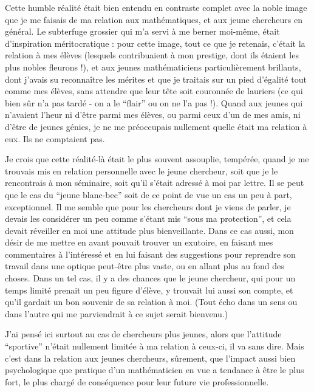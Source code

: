 Cette humble réalité était bien entendu en contraste complet avec la noble image que je me faisais de ma relation aux mathématiques, et aux jeune chercheurs en général. Le subterfuge grossier qui m'a servi à me berner moi-même, était d'inspiration méritocratique : pour cette image, tout ce que je retenais, c'était la relation à mes élèves (lesquels contribuaient à mon prestige, dont ils étaient les plus nobles fleurons !), et aux jeunes mathématiciens particulièrement brillants, dont j'avais su reconnaître les mérites et que je traitais sur un pied d'égalité tout comme mes élèves, sans attendre que leur tête soit couronnée de lauriers (ce qui bien sûr n'a pas tardé - on a le ``flair'' ou on ne l'a pas !). Quand aux jeunes qui n'avaient l'heur ni d'être parmi mes élèves, ou parmi ceux d'un de mes amis, ni d'être de jeunes génies, je ne me préoccupais nullement quelle était ma relation à eux. Ils ne comptaient pas.

Je crois que cette réalité-là était le plus souvent assouplie, tempérée, quand je me trouvais mis en relation personnelle avec le jeune chercheur, soit que je le rencontrais à mon séminaire, soit qu'il s'était adressé à moi par lettre. Il se peut que le cas du ``jeune blanc-bec'' soit de ce point de vue un cas un peu à part, exceptionnel. Il me semble que pour les chercheurs dont je viens de parler, je devais les considérer un peu comme s'étant mis ``sous ma protection'', et cela devait réveiller en moi une attitude plus bienveillante. Dans ce cas aussi, mon désir de me mettre en avant pouvait trouver un exutoire, en faisant mes commentaires à l'intéressé et en lui faisant des suggestions pour reprendre son travail dans une optique peut-être plus vaste, ou en allant plus au fond des choses. Dans un tel cas, il y a des chances que le jeune chercheur, qui pour un temps limité prenait un peu figure d'élève, y trouvait lui aussi son compte, et qu'il gardait un bon souvenir de sa relation à moi. (Tout écho dans un sens ou dans l'autre qui me parviendrait à ce sujet serait bienvenu.)

J'ai pensé ici surtout au cas de chercheurs plus jeunes, alors que l'attitude ``sportive'' n'était nullement limitée à ma relation à ceux-ci, il va sans dire. Mais c'est dans la relation aux jeunes chercheurs, sûrement, que l'impact aussi bien psychologique que pratique d'un mathématicien en vue a tendance à être le plus fort, le plus chargé de conséquence pour leur future vie professionnelle.
